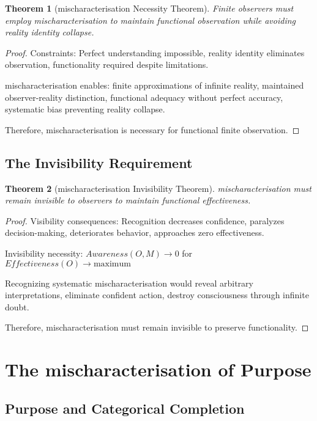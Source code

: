 \documentclass[12pt,a4paper]{article}
\newtheorem{theorem}{Theorem}[section]
\begin{document}
\begin{theorem}[mischaracterisation Necessity Theorem]
Finite observers must employ mischaracterisation to maintain functional observation while avoiding reality identity collapse.
\end{theorem}

\begin{proof}
Constraints: Perfect understanding impossible, reality identity eliminates observation, functionality required despite limitations.

mischaracterisation enables: finite approximations of infinite reality, maintained observer-reality distinction, functional adequacy without perfect accuracy, systematic bias preventing reality collapse.

Therefore, mischaracterisation is necessary for functional finite observation.
\end{proof}

\subsection{The Invisibility Requirement}

\begin{theorem}[mischaracterisation Invisibility Theorem]
mischaracterisation must remain invisible to observers to maintain functional effectiveness.
\end{theorem}

\begin{proof}
Visibility consequences: Recognition decreases confidence, paralyzes decision-making, deteriorates behavior, approaches zero effectiveness.

Invisibility necessity: $Awareness(O,M) \to 0$ for $Effectiveness(O) \to \text{maximum}$

Recognizing systematic mischaracterisation would reveal arbitrary interpretations, eliminate confident action, destroy consciousness through infinite doubt.

Therefore, mischaracterisation must remain invisible to preserve functionality.
\end{proof}

\section{The mischaracterisation of Purpose}

\subsection{Purpose and Categorical Completion}
\end{document}
